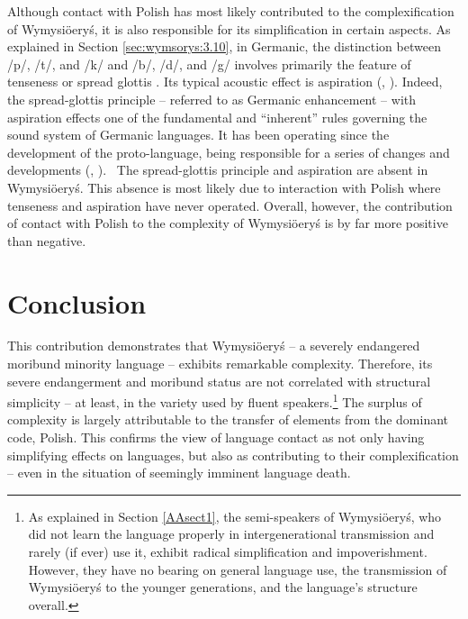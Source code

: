 \documentclass[output=paper,hidelinks]{langscibook}
\begin{document}
Although contact with Polish has most likely contributed to the complexification of Wymysiöeryś, it is also responsible for its simplification in certain aspects. As explained in Section \ref{sec:wymsorys:3.10}, in Germanic, the distinction between /p/, /t/, and /k/ and /b/, /d/, and /g/ involves primarily the feature of tenseness \citep{jessen_phonetics_1998} or spread glottis \citep[44]{harbert_germanic_2007}. Its typical acoustic effect is aspiration (\citealt{iverson_aspiration_1995, iverson_glottal_1999, iverson_laryngeal_2003, iverson_germanic_2008}, \citealt[44]{harbert_germanic_2007}). Indeed, the spread-glottis principle -- referred to as Germanic enhancement \citep[44]{iverson_laryngeal_2003} -- with aspiration effects one of the fundamental and ``inherent'' rules governing the sound system of Germanic languages. It has been operating since the development of the proto-language, being responsible for a series of changes and developments (\citealt[44]{iverson_laryngeal_2003}, \citealt[2--4]{iverson_germanic_2008}).~%
The spread-glottis principle and aspiration are absent in Wymysiöeryś. This absence is most likely due to interaction with Polish where tenseness and aspiration have never operated. Overall, however, the contribution of contact with Polish to the complexity of Wymysiöeryś is by far more positive than negative. 

\section{Conclusion}\label{sec:wymsorys:5}

This contribution demonstrates that Wymysiöeryś – a severely endangered moribund minority language – exhibits remarkable complexity. Therefore, its severe endangerment and moribund status are not correlated with structural simplicity – at least, in the variety used by fluent speakers.\footnote{As explained in Section \ref{AAsect1}, the semi-speakers of Wymysiöeryś, who did not learn the language properly in intergenerational transmission and rarely (if ever) use it, exhibit radical simplification and impoverishment. However, they have no bearing on general language use, the transmission of Wymysiöeryś to the younger generations, and the language's structure overall.} The surplus of complexity is largely attributable to the transfer of elements from the dominant code, Polish. This confirms the view of language contact as not only having simplifying effects on languages, but also as contributing to their complexification – even in the situation of seemingly imminent language death.
\end{document}
